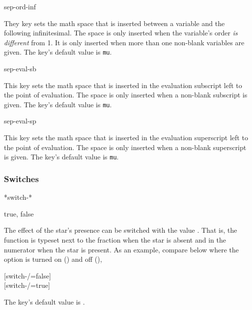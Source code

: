 \documentclass[final,british,10pt]{scrartcl}
\theoremstyle{remark}
\begin{document}
	\begin{option}{sep-ord-inf}
		\begin{values}[default = 3]
		\end{values}
		They key sets the math space that is inserted between a variable and the following infinitesimal. The space is only inserted when the variable's order \emph{is different} from \num{1}. It is only inserted when more than one non-blank variables are given. The key's default value is  \texttt{mu}.
	\end{option}
	
	\begin{option}{sep-eval-sb}
		\begin{values}[default = -4]
		\end{values}
		This key sets the math space that is inserted in the evaluation subscript left to the point of evaluation. The space is only inserted when a non-blank subscript is given. The key's default value is  \texttt{mu}.
	\end{option}
	
	\begin{option}{sep-eval-sp}
		\begin{values}[default = -4]
		\end{values}
		This key sets the math space that is inserted in the evaluation superscript left to the point of evaluation. The space is only inserted when a non-blank superscript is given. The key's default value is  \texttt{mu}.
	\end{option}
	
	\subsubsection*{Switches}
	
	\begin{option}*{switch-*}
		\begin{values}[default = false]
			true, false
		\end{values}
		The effect of the star's presence can be switched with the value . That is, the function is typeset next to the fraction when the star is absent and in the numerator when the star is present. As an example, compare below where the option is turned on () and off (),
		
		\begin{example}
			\derivset{\pdv}[switch-/=false]  \\
			\derivset{\pdv}[switch-/=true]  
		\end{example}
		
		\noindent The key's default value is .
	\end{option}
	
\end{document}
